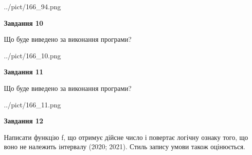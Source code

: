 \documentclass[12pt, ukrainian]{article}
\begin{document}
{\begin {large}
\begin{center}
	{../pict/166_94.png}
\end{center}
\newpage

{\begin {center}\textbf{Завдання 10}\end {center}}

Що буде виведено за виконання програми?\par
\begin{center}
	{../pict/166_10.png}
\end{center}
\newpage

{\begin {center}\textbf{Завдання 11}\end {center}}

Що буде виведено за виконання програми?\par
\begin{center}
	{../pict/166_11.png}
\end{center}
\newpage

{\begin {center}\textbf{Завдання 12}\end {center}}


Написати функцiю f, що отримує дійсне число і повертає логічну ознаку того, що воно не належить iнтервалу (2020; 2021). Стиль запису умови також оцінюється.\par
\newpage

\end {large}}
\end{document}
